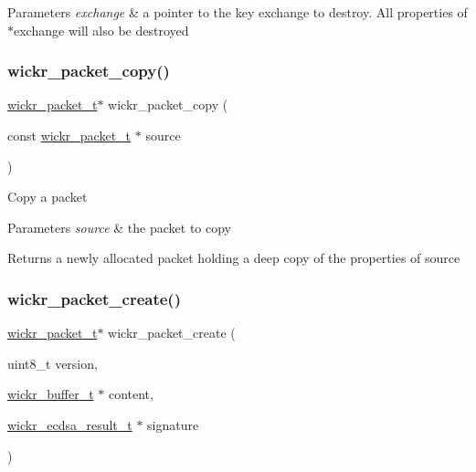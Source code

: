 \begin{DoxyParams}{Parameters}
{\em exchange} & a pointer to the key exchange to destroy. All properties of \textquotesingle{}$\ast$exchange\textquotesingle{} will also be destroyed \\
\hline
\end{DoxyParams}
\mbox{\label{group__wickr__protocol_ga0c95ad86819bacf98c11115d748039db}} 
\subsubsection{\texorpdfstring{wickr\+\_\+packet\+\_\+copy()}{wickr\_packet\_copy()}}
{\footnotesize\ttfamily \hyperlink{structwickr__packet}{wickr\+\_\+packet\+\_\+t}$\ast$ wickr\+\_\+packet\+\_\+copy (\begin{DoxyParamCaption}\item[{const \hyperlink{structwickr__packet}{wickr\+\_\+packet\+\_\+t} $\ast$}]{source }\end{DoxyParamCaption})}

Copy a packet


\begin{DoxyParams}{Parameters}
{\em source} & the packet to copy \\
\hline
\end{DoxyParams}
\begin{DoxyReturn}{Returns}
a newly allocated packet holding a deep copy of the properties of \textquotesingle{}source\textquotesingle{} 
\end{DoxyReturn}
\mbox{\label{group__wickr__protocol_gac952913ddaf848d2def181cd55b30883}} 
\subsubsection{\texorpdfstring{wickr\+\_\+packet\+\_\+create()}{wickr\_packet\_create()}}
{\footnotesize\ttfamily \hyperlink{structwickr__packet}{wickr\+\_\+packet\+\_\+t}$\ast$ wickr\+\_\+packet\+\_\+create (\begin{DoxyParamCaption}\item[{uint8\+\_\+t}]{version,  }\item[{\hyperlink{structwickr__buffer}{wickr\+\_\+buffer\+\_\+t} $\ast$}]{content,  }\item[{\hyperlink{structwickr__ecdsa__result}{wickr\+\_\+ecdsa\+\_\+result\+\_\+t} $\ast$}]{signature }\end{DoxyParamCaption})}

